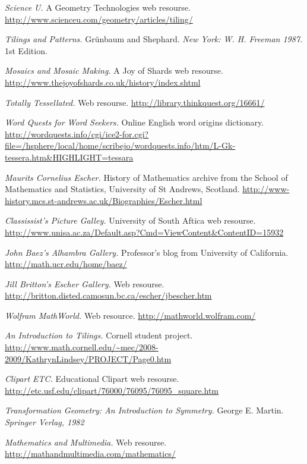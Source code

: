 \documentclass[a4paper,12pt,twoside,abstraction,titlepage]{article}
\theoremstyle{remark}
\theoremstyle{definition}
\begin{document}
\newpage
\begin{thebibliography}{99}
 \emph{Science U.} A Geometry Technologies web resourse. \url{http://www.scienceu.com/geometry/articles/tiling/}

 \emph{Tilings and Patterns.} Gr\"{u}nbaum and Shephard. \emph{New York: W. H. Freeman 1987.} 1st Edition.

 \emph{Mosaics and Mosaic Making.} A Joy of Shards web resourse. \url{http://www.thejoyofshards.co.uk/history/index.shtml}

 \emph{Totally Tessellated.} Web resourse. \url{http://library.thinkquest.org/16661/}

 \emph{Word Quests for Word Seekers.} Online English word origins dictionary. \url{http://wordquests.info/cgi/ice2-for.cgi?file=/hsphere/local/home/scribejo/wordquests.info/htm/L-Gk-tessera.htm&HIGHLIGHT=tessara}

 \emph{Maurits Cornelius Escher.} History of Mathematics archive from the School of Mathematics and Statistics, University of St Andrews, Scotland. \url{http://www-history.mcs.st-andrews.ac.uk/Biographies/Escher.html}

 \emph{Classissist's Picture Galley.} University of South Aftica web resourse. \url{http://www.unisa.ac.za/Default.asp?Cmd=ViewContent&ContentID=15932}

 \emph{John Baez's Alhambra Gallery.} Professor's blog from University of California. \url{http://math.ucr.edu/home/baez/}

 \emph{Jill Britton's Escher Gallery.} Web resourse. \url{http://britton.disted.camosun.bc.ca/escher/jbescher.htm}

 \emph{Wolfram MathWorld.} Web resource. \url{http://mathworld.wolfram.com/}

 \emph{An Introduction to Tilings.} Cornell student project. \url{http://www.math.cornell.edu/~mec/2008-2009/KathrynLindsey/PROJECT/Page0.htm}

 \emph{Clipart ETC.} Educational Clipart web resourse. \url{http://etc.usf.edu/clipart/76000/76095/76095_square.htm}

 \emph{Transformation Geometry: An Introduction to Symmetry.} George E. Martin. \emph{Springer Verlag, 1982}

 \emph{Mathematics and Multimedia.} Web resourse. \url{http://mathandmultimedia.com/mathematics/}

\end{thebibliography}
\end{document}
